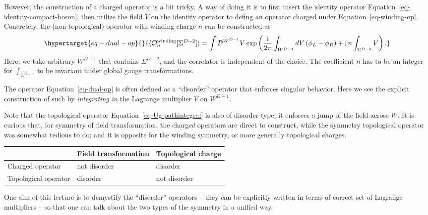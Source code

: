 \documentclass[
  letterpaper,
  DIV=11,
  numbers=noendperiod]{scrreport}
\DeclareMathOperator{\imunit}{i}
\newcommand{\stdim}{D}
\begin{document}
However, the construction of a charged operator is a bit tricky. A way
of doing it is to first insert the identity operator
Equation~\ref{eq-identity-compact-boson}, then utilize the field \(V\)
on the identity operator to defing an operator charged under
Equation~\ref{eq-winding-op}. Concretely, the (non-topological) operator
with winding charge \(n\) can be constructed as
\begin{equation}\protect\hypertarget{eq-dual-op}{}{
\langle \mathcal{O}^\text{winding}_n[\Sigma^{D-2}] \rangle
= \int \mathcal{D}^{W^{\stdim-1}}V \exp\left(\frac{\imunit}{2\pi}\int_{W^{\stdim-1}} \mathop{dV}\left(\phi_L-\phi_R\right)+\imunit n \int_{\Sigma^{\stdim-2}}V\right).
}\label{eq-dual-op}\end{equation} Here, we take arbitrary
\(W^{\stdim-1}\) that contains \(\Sigma^{\stdim-2}\), and the correlator
is independent of the choice. The coefficient \(n\) has to be an integer
for \(\int_{\Sigma^{D-1}}\) to be invariant under global gauge
transformations.

The operator Equation~\ref{eq-dual-op} is often defined as a
``disorder'' operator that enforces singular behavior. Here we see the
explicit construction of such by \emph{integrating in} the Lagrange
multiplier \(V\) on \(W^{\stdim-1}\).

\begin{tcolorbox}[enhanced jigsaw, opacityback=0, toprule=.15mm, colback=white, arc=.35mm, bottomrule=.15mm, coltitle=black, titlerule=0mm, breakable, bottomtitle=1mm, colbacktitle=quarto-callout-note-color!10!white, toptitle=1mm, colframe=quarto-callout-note-color-frame, title=\textcolor{quarto-callout-note-color}{\faInfo}\hspace{0.5em}{Note}, rightrule=.15mm, leftrule=.75mm, opacitybacktitle=0.6, left=2mm]

Note that the topological operator Equation~\ref{eq-Ug-pathintegral} is
also of disorder-type; it enforces a jump of the field across \(W\). It
is curious that, for symmetry of field transformation, the
charg\emph{ed} operators are direct to construct, while the symmetry
topological operator was somewhat tedious to do; and it is opposite for
the winding symmetry, or more generally topological charges.

\begin{longtable}[]{@{}lll@{}}
\toprule\noalign{}
& Field transformation & Topological charge \\
\midrule\noalign{}
\endhead
\bottomrule\noalign{}
\endlastfoot
Charged operator & not disorder & disorder \\
Topological operator & disorder & not disorder \\
\end{longtable}

One aim of this lecture is to demystify the ``disorder'' operators --
they can be explicitly written in terms of correct set of Lagrange
multipliers -- so that one can talk about the two types of the symmetry
in a unified way.

\end{tcolorbox}
\end{document}
